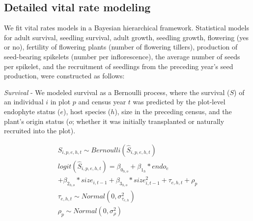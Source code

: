 \documentclass[lineno, sn-basic]{sn-jnl}%
\providecommand{\DIFadd}[1]{{\protect\color{blue}#1}} %
\providecommand{\DIFadd}[1]{{\protect\color{blue}\uwave{#1}}} %
\providecommand{\DIFaddbegin}{} %
\providecommand{\DIFaddend}{} %
\providecommand{\DIFdelbegin}{} %
\providecommand{\DIFdelend}{} %
\newcommand{\DIFscaledelfig}{0.5}
\newlength{\DIFdelgraphicswidth} %
\newlength{\DIFdelgraphicsheight} %
\newcommand{\DIFaddincludegraphics}[2][]{{\color{blue}\fbox{\DIFOincludegraphics[#1]{#2}}}} %
\newcommand{\DIFdelincludegraphics}[2][]{%
\sbox{\DIFdelgraphicsbox}{\DIFOincludegraphics[#1]{#2}}%
\settoboxwidth{\DIFdelgraphicswidth}{\DIFdelgraphicsbox} %
\settoboxtotalheight{\DIFdelgraphicsheight}{\DIFdelgraphicsbox} %
\scalebox{\DIFscaledelfig}{%
\parbox[b]{\DIFdelgraphicswidth}{\usebox{\DIFdelgraphicsbox}\\[-\baselineskip] \rule{\DIFdelgraphicswidth}{0em}}\llap{\resizebox{\DIFdelgraphicswidth}{\DIFdelgraphicsheight}{%
\setlength{\unitlength}{\DIFdelgraphicswidth}%
\begin{picture}(1,1)%
\thicklines\linethickness{2pt} %
{\color[rgb]{1,0,0}\put(0,0){\framebox(1,1){}}}%
{\color[rgb]{1,0,0}\put(0,0){\line( 1,1){1}}}%
{\color[rgb]{1,0,0}\put(0,1){\line(1,-1){1}}}%
\end{picture}%
}\hspace*{3pt}}} %
} %
\DeclareRobustCommand{\DIFaddbegin}{\DIFOaddbegin \let\includegraphics\DIFaddincludegraphics} %
\DeclareRobustCommand{\DIFaddend}{\DIFOaddend \let\includegraphics\DIFOincludegraphics} %
\DeclareRobustCommand{\DIFdelbegin}{\DIFOdelbegin \let\includegraphics\DIFdelincludegraphics} %
\DeclareRobustCommand{\DIFdelend}{\DIFOaddend \let\includegraphics\DIFOincludegraphics} %
\begin{document}
\subsection{\DIFadd{Detailed vital rate modeling}}\label{SupMethods2}

\DIFaddend We fit vital rates models in a Bayesian hierarchical framework. 
Statistical models for adult survival, seedling survival, adult growth, seedling growth, flowering (yes or no), fertility of flowering plants (number of flowering tillers), production of seed-bearing spikelets (number per inflorescence), the average number of seeds per spikelet, and the recruitment of seedlings from the preceding year's seed production, were constructed as follows:

\emph{Survival} - We modeled survival as a Bernoulli process, where the survival ($S$) of an individual $i$ in plot $p$ and census year $t$ was predicted by the plot-level endophyte status ($e$), host species ($h$), size in the preceding census, and the plant's origin status (\DIFaddbegin \DIFadd{$o$; }\DIFaddend whether it was initially transplanted or naturally recruited into the plot).

\begin{subequations}
	\label{eq:survival}
	\DIFdelbegin %
\DIFdelend \DIFaddbegin \begin{align}
		S_{i,p,e,h,t} \sim Bernoulli(\hat{S}_{i,p,e,h,t})\\
		logit(\hat{S}_{i,p,e,h,t}) = \beta_{0_{h,o}} + \beta_{1_{h}}*endo_{e}\\
		+ \beta_{2_{h,o}}*size_{i,t-1} +\beta_{3_{h,o}}*size^2_{i,t-1} + \tau_{e,h,t} + \rho_{p}\\
		\tau_{e,h,t} \sim Normal(0,\sigma^2_{\tau_{e,h}})\\
		\rho_{p} \sim Normal(0,\sigma^2_{\rho})
	\end{align}
\DIFaddend \end{subequations}
\end{document}
